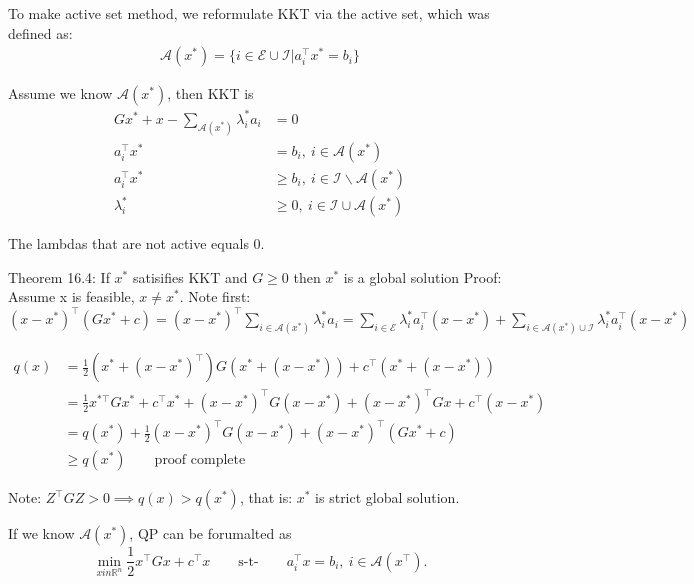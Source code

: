 \documentclass{article}
\begin{document}
To make active set method, we reformulate KKT via the active set, which was defined as:
\begin{align*}
  \mathcal{A}(x^*) = \{i\in \mathcal{E}\cup\mathcal{I} | a_i^{\top}x^* = b_i\}
\end{align*}

Assume we know $\mathcal{A}(x^*)$, then KKT is
\begin{align*}
  Gx^* + x - \sum_{\mathcal{A}(x^*)}\lambda_i^*a_i & = 0                                                      \\
  a_i^{\top}x^*                                    & = b_i,\  i\in \mathcal{A}(x^*)                           \\
  a_i^{\top}x^*                                    & \geq b_i,\  i\in \mathcal{I} \backslash \mathcal{A}(x^*) \\
  \lambda_i^*                                      & \geq 0 ,\ i\in \mathcal{I}\cup\mathcal{A}(x^*)
\end{align*}

The lambdas that are not active equals 0.

\begin{proofbox}{Theorem 16.4: If $x^*$ satisifies KKT and $G \geq 0$ then $x^*$ is a global solution}
  Proof: Assume x is feasible, $x \neq x^*$. Note first: $(x-x^*)^{\top}(Gx^*+ c) = (x-x^*)^{\top}\sum_{i\in \mathcal{A}(x^*)}\lambda_i^*a_i = \sum_{i\in \mathcal{E}}\lambda_i^*a_i^{\top}(x-x^*) + \sum_{i\in \mathcal{A}(x^*) \cup\mathcal{I}}\lambda_i^*a_i^{\top}(x-x^*)$

  \medskip \begin{align*}
    q(x) & = \frac{1}{2}(x^*+ (x-x^*)^{\top})G(x^*+ (x-x^*))+c^{\top}(x^*+(x-x^*))                           \\
         & = \frac{1}{2}x^{*\top}Gx^*+c^{\top}x^*+ (x-x^*)^{\top}G(x-x^*) + (x-x^*)^{\top}Gx+c^{\top}(x-x^*) \\
         & = q(x^*) + \frac{1}{2}(x-x^*)^{\top}G(x-x^*)+(x-x^*)^{\top}(Gx^* + c)                             \\
         & \geq q(x^*)\qquad\text{proof complete}
  \end{align*}

  \medskip Note: $Z^{\top}GZ > 0 \implies q(x) > q(x^*)$, that is: $x^*$ is strict global solution.
\end{proofbox}

\medskip If we know $\mathcal{A}(x^*)$, QP can be forumalted as
\[
  \min_{xin\mathbb{R}^{n}} \frac{1}{2}x^{\top}Gx + c^{\top}x \qquad\text{s-t-}\qquad a_i^{\top}x = b_i ,\ i\in \mathcal{A}(x^{\top})
  .\]
\end{document}
